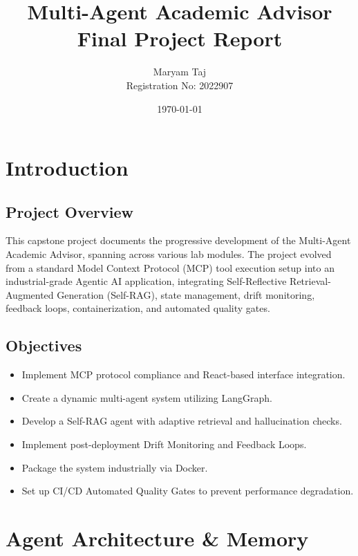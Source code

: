 \documentclass[12pt, a4paper]{report}
\title{\textbf{Multi-Agent Academic Advisor} \\ \large Final Project Report}
\author{Maryam Taj \\ Registration No: 2022907}
\date{\today}
\begin{document}
\maketitle
\tableofcontents
\newpage

\chapter{Introduction}
\section{Project Overview}
This capstone project documents the progressive development of the Multi-Agent Academic Advisor, spanning across various lab modules. The project evolved from a standard Model Context Protocol (MCP) tool execution setup into an industrial-grade Agentic AI application, integrating Self-Reflective Retrieval-Augmented Generation (Self-RAG), state management, drift monitoring, feedback loops, containerization, and automated quality gates.

\section{Objectives}
\begin{itemize}
    \item Implement MCP protocol compliance and React-based interface integration.
    \item Create a dynamic multi-agent system utilizing LangGraph.
    \item Develop a Self-RAG agent with adaptive retrieval and hallucination checks.
    \item Implement post-deployment Drift Monitoring and Feedback Loops.
    \item Package the system industrially via Docker.
    \item Set up CI/CD Automated Quality Gates to prevent performance degradation.
\end{itemize}

\chapter{Agent Architecture \& Memory}
\end{document}
